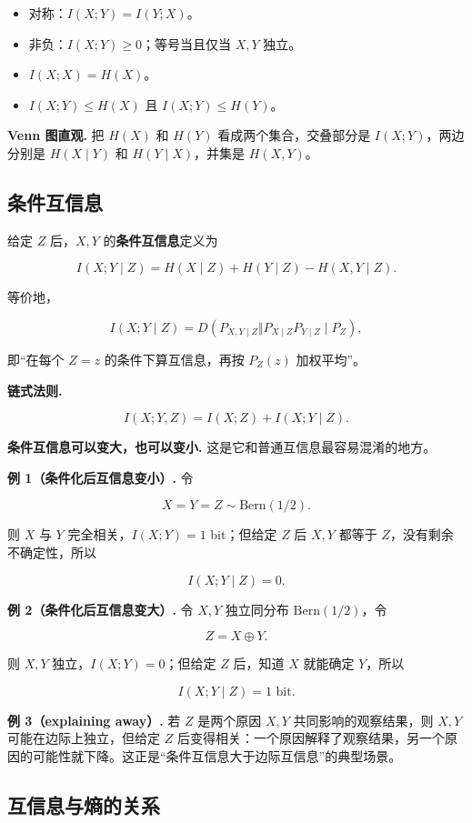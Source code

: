 \begin{itemize}
\item 对称：$I(X;Y)=I(Y;X)$。
\item 非负：$I(X;Y)\ge0$；等号当且仅当 $X,Y$ 独立。
\item $I(X;X)=H(X)$。
\item $I(X;Y)\le H(X)$ 且 $I(X;Y)\le H(Y)$。
\end{itemize}


\textbf{Venn 图直观.} 把 $H(X)$ 和 $H(Y)$ 看成两个集合，交叠部分是 $I(X;Y)$，两边分别是 $H(X\mid Y)$ 和 $H(Y\mid X)$，并集是 $H(X,Y)$。

\subsection{条件互信息}


给定 $Z$ 后，$X,Y$ 的\textbf{条件互信息}定义为

\[
\boxed{
I(X;Y\mid Z)
=H(X\mid Z)+H(Y\mid Z)-H(X,Y\mid Z)
}.
\]

等价地，

\[
I(X;Y\mid Z)
=D(P_{X,Y\mid Z}\Vert P_{X\mid Z}P_{Y\mid Z}\mid P_Z),
\]

即“在每个 $Z=z$ 的条件下算互信息，再按 $P_Z(z)$ 加权平均”。

\textbf{链式法则.}

\[
I(X;Y,Z)=I(X;Z)+I(X;Y\mid Z).
\]

\textbf{条件互信息可以变大，也可以变小.} 这是它和普通互信息最容易混淆的地方。

\textbf{例 1（条件化后互信息变小）.} 令

\[
X=Y=Z\sim\mathrm{Bern}(1/2).
\]

则 $X$ 与 $Y$ 完全相关，$I(X;Y)=1$ bit；但给定 $Z$ 后 $X,Y$ 都等于 $Z$，没有剩余不确定性，所以

\[
I(X;Y\mid Z)=0.
\]

\textbf{例 2（条件化后互信息变大）.} 令 $X,Y$ 独立同分布 $\mathrm{Bern}(1/2)$，令

\[
Z=X\oplus Y.
\]

则 $X,Y$ 独立，$I(X;Y)=0$；但给定 $Z$ 后，知道 $X$ 就能确定 $Y$，所以

\[
I(X;Y\mid Z)=1\text{ bit}.
\]

\textbf{例 3（explaining away）.} 若 $Z$ 是两个原因 $X,Y$ 共同影响的观察结果，则 $X,Y$ 可能在边际上独立，但给定 $Z$ 后变得相关：一个原因解释了观察结果，另一个原因的可能性就下降。这正是“条件互信息大于边际互信息”的典型场景。

\subsection{互信息与熵的关系}


